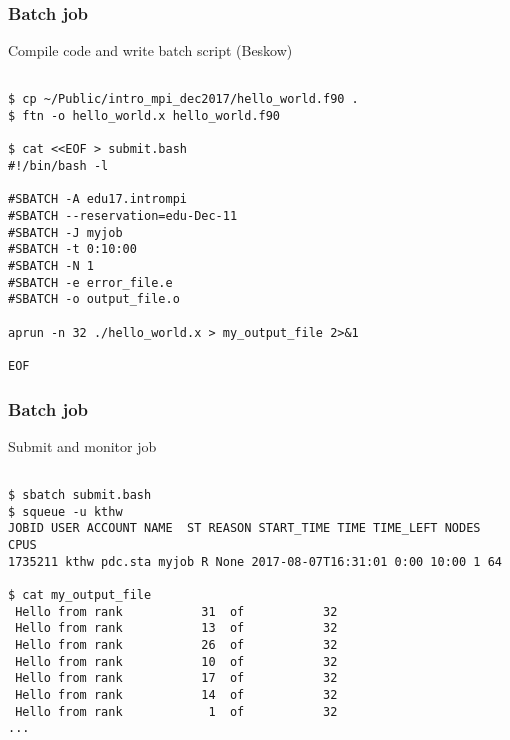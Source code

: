 \begin{frame}[fragile]
  \frametitle{Batch job}
  \begin{alertblock}{Compile code and write batch script (Beskow)}
    \verbatimfont{\footnotesize}
    \begin{verbatim}

$ cp ~/Public/intro_mpi_dec2017/hello_world.f90 .
$ ftn -o hello_world.x hello_world.f90

$ cat <<EOF > submit.bash
#!/bin/bash -l

#SBATCH -A edu17.intrompi
#SBATCH --reservation=edu-Dec-11
#SBATCH -J myjob
#SBATCH -t 0:10:00
#SBATCH -N 1
#SBATCH -e error_file.e
#SBATCH -o output_file.o

aprun -n 32 ./hello_world.x > my_output_file 2>&1

EOF

 \end{verbatim}
\end{alertblock}


\end{frame}



\begin{frame}[fragile]
  \frametitle{Batch job}
  \begin{alertblock}{Submit and monitor job}
    \verbatimfont{\footnotesize}
    \begin{verbatim}

$ sbatch submit.bash
$ squeue -u kthw
JOBID USER ACCOUNT NAME  ST REASON START_TIME TIME TIME_LEFT NODES CPUS
1735211 kthw pdc.sta myjob R None 2017-08-07T16:31:01 0:00 10:00 1 64

$ cat my_output_file
 Hello from rank           31  of           32
 Hello from rank           13  of           32
 Hello from rank           26  of           32
 Hello from rank           10  of           32
 Hello from rank           17  of           32
 Hello from rank           14  of           32
 Hello from rank            1  of           32
...


 \end{verbatim}
\end{alertblock}


\end{frame}




